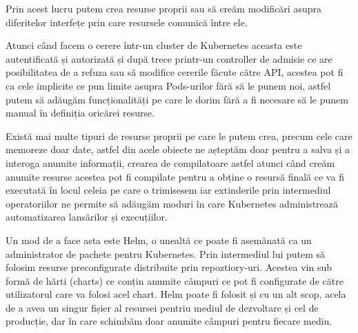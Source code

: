 Prin acest lucru putem crea resurse proprii sau să creăm modificări asupra diferitelor 
interfețe prin care resursele comunică între ele.

Atunci când facem o cerere într-un cluster de Kubernetes aceasta este autentificată și autorizată 
și după trece printr-un controller de admisie ce are posibilitatea de a refuza sau să modifice
cererile făcute către API, acestea pot fi ca cele implicite ce pun limite asupra Pods-urilor
fără să le punem noi, astfel putem să adăugăm funcționalități pe care le dorim fără 
a fi necesare să le punem manual în definiția oricărei resurse.

Există mai multe tipuri de resurse proprii pe care le putem crea, precum cele care 
memoreze doar date, astfel din acele obiecte ne așteptăm doar pentru a salva și a interoga anumite
informații, crearea de compilatoare astfel atunci când creăm anumite resurse acestea pot fi compilate 
pentru a obține o resursă finală ce va fi executată în locul celeia pe care o trimisesem iar 
extinderile prin intermediul operatoriilor ne permite să adăugăm moduri în care Kubernetes 
administrează automatizarea lansărilor și execuțiilor.

Un mod de a face asta este Helm, o unealtă ce poate fi asemănată ca un administrator
de pachete pentru Kubernetes. Prin intermediul lui putem să folosim resurse preconfigurate
distribuite prin repoztiory-uri. Acestea vin sub formă de hărti (charts) ce conțin
anumite câmpuri ce pot fi configurate de către utilizatorul care va folosi acel chart.
Helm poate fi folosit și cu un alt scop, acela de a avea un singur fișier al resursei
pentriu mediul de dezvoltare și cel de producție, dar în care schimbăm doar anumite
câmpuri pentru fiecare mediu.
